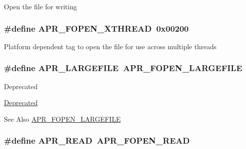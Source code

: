Open the file for writing \hypertarget{group__apr__file__open__flags_ga435cd9b2604b11796779c23ffa00a3dd}{
\subsubsection[{A\-P\-R\-\_\-\-F\-O\-P\-E\-N\-\_\-\-X\-T\-H\-R\-E\-A\-D}]{\setlength{\rightskip}{0pt plus 5cm}\#define A\-P\-R\-\_\-\-F\-O\-P\-E\-N\-\_\-\-X\-T\-H\-R\-E\-A\-D~0x00200}}\label{group__apr__file__open__flags_ga435cd9b2604b11796779c23ffa00a3dd}
Platform dependent tag to open the file for use across multiple threads \hypertarget{group__apr__file__open__flags_gaafa04fd4ec71910a5d7af1c7f5596bad}{
\subsubsection[{A\-P\-R\-\_\-\-L\-A\-R\-G\-E\-F\-I\-L\-E}]{\setlength{\rightskip}{0pt plus 5cm}\#define A\-P\-R\-\_\-\-L\-A\-R\-G\-E\-F\-I\-L\-E~{\bf A\-P\-R\-\_\-\-F\-O\-P\-E\-N\-\_\-\-L\-A\-R\-G\-E\-F\-I\-L\-E}}}\label{group__apr__file__open__flags_gaafa04fd4ec71910a5d7af1c7f5596bad}
\begin{DoxyRefDesc}{Deprecated}
\item[\hyperlink{deprecated__deprecated000030}{Deprecated}]\end{DoxyRefDesc}
\begin{DoxySeeAlso}{See Also}
\hyperlink{group__apr__file__open__flags_gaf6cfaa4789e6264afd186235f0adbc22}{A\-P\-R\-\_\-\-F\-O\-P\-E\-N\-\_\-\-L\-A\-R\-G\-E\-F\-I\-L\-E} 
\end{DoxySeeAlso}
\hypertarget{group__apr__file__open__flags_ga0021db78d799d1c8825b701c7efee483}{
\subsubsection[{A\-P\-R\-\_\-\-R\-E\-A\-D}]{\setlength{\rightskip}{0pt plus 5cm}\#define A\-P\-R\-\_\-\-R\-E\-A\-D~{\bf A\-P\-R\-\_\-\-F\-O\-P\-E\-N\-\_\-\-R\-E\-A\-D}}}\label{group__apr__file__open__flags_ga0021db78d799d1c8825b701c7efee483}
